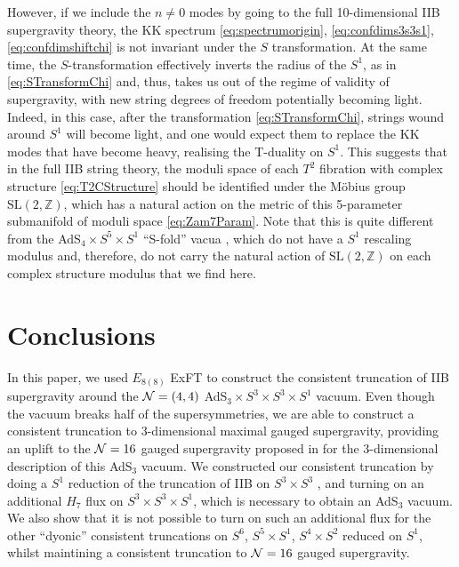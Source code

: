 \documentclass[a4paper, 11pt]{article}
\numberwithin{equation}{section}
\newcommand{\SL}[1]{\mathrm{SL}( #1 )}
\newcommand{\EE}{\ensuremath{E_{8(8)}}\xspace}
\newcommand{\+}{\oplus}
\begin{document}
However, if we include the $n \neq 0$ modes by going to the full 10-dimensional IIB supergravity theory, the KK spectrum \eqref{eq:spectrumorigin}, \eqref{eq:confdims3s3s1}, \eqref{eq:confdimshiftchi} is not invariant under the $S$ transformation. At the same time, the $S$-transformation effectively inverts the radius of the $S^1$, as in \eqref{eq:STransformChi} and, thus, takes us out of the regime of validity of supergravity, with new string degrees of freedom potentially becoming light. Indeed, in this case, after the transformation \eqref{eq:STransformChi}, strings wound around $S^1$ will become light, and one would expect them to replace the KK modes that have become heavy, realising the T-duality on $S^1$. This suggests that in the full IIB string theory, the moduli space of each $T^2$ fibration with complex structure \eqref{eq:T2CStructure} should be identified under the M\"{o}bius group $\SL{2,\mathbb{Z}}$, which has a natural action on the metric of this 5-parameter submanifold of moduli space \eqref{eq:Zam7Param}. Note that this is quite different from the AdS$_4 \times S^5 \times S^1$ ``S-fold'' vacua \cite{Giambrone:2021zvp,Giambrone:2021wsm}, which do not have a $S^1$ rescaling modulus and, therefore, do not carry the natural action of $\SL{2,\mathbb{Z}}$ on each complex structure modulus that we find here.


\section{Conclusions} \label{s:Conclusions}
In this paper, we used $\EE$ ExFT to construct the consistent truncation of IIB supergravity around the ${\cal N}=(4,4)$ AdS$_3 \times S^3 \times S^3 \times S^1$ vacuum. Even though the vacuum breaks half of the supersymmetries, we are able to construct a consistent truncation to 3-dimensional maximal gauged supergravity, providing an uplift to the ${\cal N}=16$ gauged supergravity proposed in \cite{Hohm:2005ui} for the 3-dimensional description of this AdS$_3$ vacuum. We constructed our consistent truncation by doing a $S^1$ reduction of the truncation of IIB on $S^3 \times S^3$ \cite{Inverso:2016eet}, and turning on an additional $H_7$ flux on $S^3 \times S^3 \times S^1$, which is necessary to obtain an AdS$_3$ vacuum. We also show that it is not possible to turn on such an additional flux for the other ``dyonic'' consistent truncations on $S^6$, $S^5 \times S^1$, $S^4 \times S^2$ \cite{Guarino:2015jca,Inverso:2016eet} reduced on $S^1$, whilst maintining a consistent truncation to ${\cal N}=16$ gauged supergravity.
\end{document}
